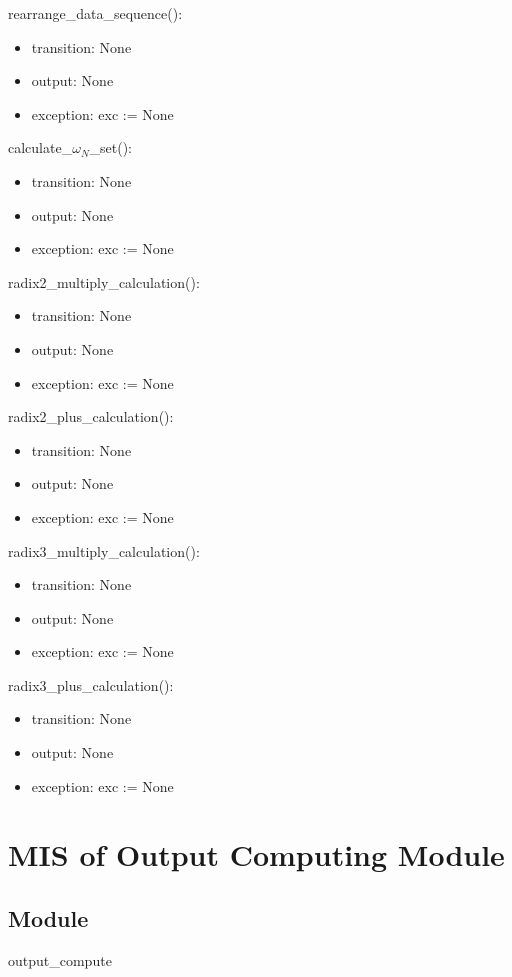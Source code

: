 \documentclass[12pt, titlepage]{article}
\begin{document}
rearrange\_data\_sequence():
\begin{itemize}
\item transition: None
\item output:  None
\item exception: exc := None
\end{itemize}
calculate\_$\omega _{N}$\_set():
\begin{itemize}
\item transition: None
\item output:  None
\item exception: exc := None
\end{itemize}
radix2\_multiply\_calculation():
\begin{itemize}
\item transition: None
\item output:  None
\item exception: exc := None
\end{itemize}
radix2\_plus\_calculation():
\begin{itemize}
\item transition: None
\item output:  None
\item exception: exc := None
\end{itemize}
radix3\_multiply\_calculation():
\begin{itemize}
\item transition: None
\item output:  None
\item exception: exc := None
\end{itemize}
radix3\_plus\_calculation():
\begin{itemize}
\item transition: None
\item output:  None
\item exception: exc := None
\end{itemize}

\section{MIS of Output Computing Module} \label{Input} 

\subsection{Module}

output\_compute
\end{document}
